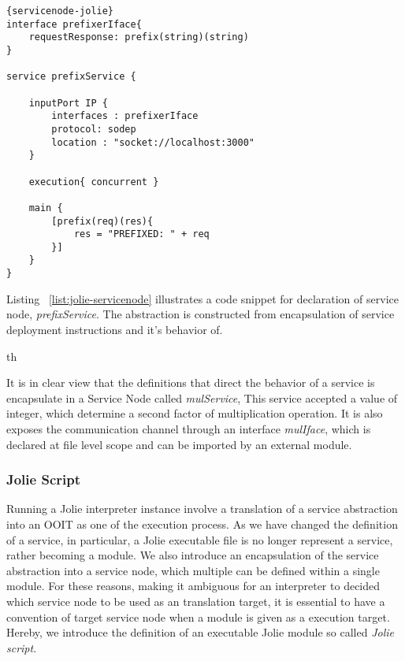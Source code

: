 \begin{listing}[h]

    \lstset{language=Jolie,
        style=codeStyle,
        numbers=left,
        firstnumber=1
    }
    \begin{lstlisting}[frame=tlrb, caption= {Jolie Service Node Example}, label={list:jolie-servicenode} ]{servicenode-jolie}
interface prefixerIface{
    requestResponse: prefix(string)(string)
}

service prefixService {
    
    inputPort IP {
        interfaces : prefixerIface
        protocol: sodep
        location : "socket://localhost:3000"
    }

    execution{ concurrent }

    main {
        [prefix(req)(res){
            res = "PREFIXED: " + req
        }]
    }
}
    \end{lstlisting}
\end{listing}

Listing ~\ref{list:jolie-servicenode} illustrates a code snippet for declaration of service node, \textit{prefixService}. The abstraction is constructed from encapsulation of service deployment instructions and it's behavior of.

th

It is in clear view that the definitions that direct the behavior of a service is encapsulate in a Service Node called \textit{mulService}, This service accepted a value of integer, which determine a second factor of multiplication operation. It is also exposes the communication channel through an interface \textit{mulIface}, which is declared at file level scope and can be imported by an external module.

\FloatBarrier

\subsubsection*{Jolie Script}

Running a Jolie interpreter instance involve a translation of a service abstraction into an OOIT as one of the execution process.
As we have changed the definition of a service, in particular, a Jolie executable file is no longer represent a service, rather becoming a module.
We also introduce an encapsulation of the service abstraction into a service node, which multiple can be defined within a single module.
For these reasons, making it ambiguous for an interpreter to decided which service node to be used as an translation target, it is essential to have a convention of target service node when a module is given as a execution target.
Hereby, we introduce the definition of an executable Jolie module so called \textit{Jolie script}.

